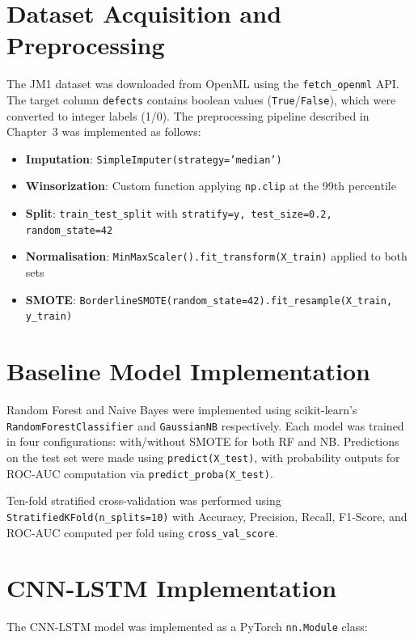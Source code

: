 \documentclass[12pt,a4paper,oneside]{report}
\begin{document}
\section{Dataset Acquisition and Preprocessing}

The JM1 dataset was downloaded from OpenML using the \texttt{fetch\_openml} API. The target column \texttt{defects} contains boolean values (\texttt{True}/\texttt{False}), which were converted to integer labels (1/0). The preprocessing pipeline described in Chapter~3 was implemented as follows:

\begin{itemize}
  \item \textbf{Imputation}: \texttt{SimpleImputer(strategy='median')}
  \item \textbf{Winsorization}: Custom function applying \texttt{np.clip} at the 99th percentile
  \item \textbf{Split}: \texttt{train\_test\_split} with \texttt{stratify=y, test\_size=0.2, random\_state=42}
  \item \textbf{Normalisation}: \texttt{MinMaxScaler().fit\_transform(X\_train)} applied to both sets
  \item \textbf{SMOTE}: \texttt{BorderlineSMOTE(random\_state=42).fit\_resample(X\_train, y\_train)}
\end{itemize}

\section{Baseline Model Implementation}

Random Forest and Naive Bayes were implemented using scikit-learn's \texttt{RandomForestClassifier} and \texttt{GaussianNB} respectively. Each model was trained in four configurations: with/without SMOTE for both RF and NB. Predictions on the test set were made using \texttt{predict(X\_test)}, with probability outputs for ROC-AUC computation via \texttt{predict\_proba(X\_test)}.

Ten-fold stratified cross-validation was performed using \texttt{StratifiedKFold(n\_splits=10)} with Accuracy, Precision, Recall, F1-Score, and ROC-AUC computed per fold using \texttt{cross\_val\_score}.

\section{CNN-LSTM Implementation}

The CNN-LSTM model was implemented as a PyTorch \texttt{nn.Module} class:
\end{document}
